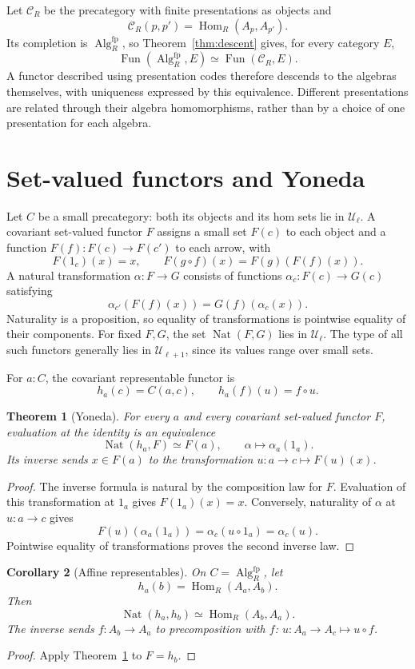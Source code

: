 \documentclass[11pt]{amsart}
\newtheorem{theorem}{Theorem}[section]
\newtheorem{corollary}[theorem]{Corollary}
\theoremstyle{definition}
\theoremstyle{remark}
\newcommand{\UU}{\mathcal U}
\newcommand{\Hom}{\operatorname{Hom}}
\newcommand{\Fun}{\operatorname{Fun}}
\newcommand{\Nat}{\operatorname{Nat}}
\newcommand{\Alg}{\operatorname{Alg}}
\begin{document}
Let $\mathcal C_R$ be the precategory with finite presentations as
objects and
\[
 \mathcal C_R(p,p')=\Hom_R(A_p,A_{p'}).
\]
Its completion is $\Alg_R^{\mathrm{fp}}$, so
Theorem~\ref{thm:descent} gives, for every category $E$,
\[
 \Fun(\Alg_R^{\mathrm{fp}},E)\simeq\Fun(\mathcal C_R,E).
\]
A functor described using presentation codes therefore descends to the
algebras themselves, with uniqueness expressed by this equivalence.
Different presentations are related through their algebra homomorphisms,
rather than by a choice of one presentation for each algebra.

\section{Set-valued functors and Yoneda}

Let $C$ be a small precategory: both its objects and its hom sets lie in
$\UU_\ell$. A covariant set-valued functor $F$ assigns a small set $F(c)$
to each object and a function $F(f):F(c)\to F(c')$ to each arrow, with
\[
 F(1_c)(x)=x,\qquad F(g\circ f)(x)=F(g)(F(f)(x)).
\]
A natural transformation $\alpha:F\to G$ consists of functions
$\alpha_c:F(c)\to G(c)$ satisfying
\[
 \alpha_{c'}(F(f)(x))=G(f)(\alpha_c(x)).
\]
Naturality is a proposition, so equality of transformations is pointwise
equality of their components. For fixed $F,G$, the set $\Nat(F,G)$ lies
in $\UU_\ell$. The type of all such functors generally lies in
$\UU_{\ell+1}$, since its values range over small sets.

For $a:C$, the covariant representable functor is
\[
 h_a(c)=C(a,c),\qquad h_a(f)(u)=f\circ u.
\]
\begin{theorem}[Yoneda]\label{thm:yoneda}
For every $a$ and every covariant set-valued functor $F$, evaluation at
the identity is an equivalence
\[
 \Nat(h_a,F)\simeq F(a),\qquad
 \alpha\longmapsto\alpha_a(1_a).
\]
Its inverse sends $x\in F(a)$ to the transformation
$u:a\to c\longmapsto F(u)(x)$.
\end{theorem}
\begin{proof}
The inverse formula is natural by the composition law for $F$.
Evaluation of this transformation at $1_a$ gives $F(1_a)(x)=x$.
Conversely, naturality of $\alpha$ at $u:a\to c$ gives
\[
 F(u)(\alpha_a(1_a))=\alpha_c(u\circ1_a)=\alpha_c(u).
\]
Pointwise equality of transformations proves the second inverse law.
\end{proof}

\begin{corollary}[Affine representables]\label{cor:affine}
On $C=\Alg_R^{\mathrm{fp}}$, let
\[
 h_a(b)=\Hom_R(A_a,A_b).
\]
Then
\[
 \Nat(h_a,h_b)\simeq\Hom_R(A_b,A_a).
\]
The inverse sends $f:A_b\to A_a$ to precomposition with $f$:
$u:A_a\to A_c\longmapsto u\circ f$.
\end{corollary}
\begin{proof}
Apply Theorem~\ref{thm:yoneda} to $F=h_b$.
\end{proof}
\end{document}
